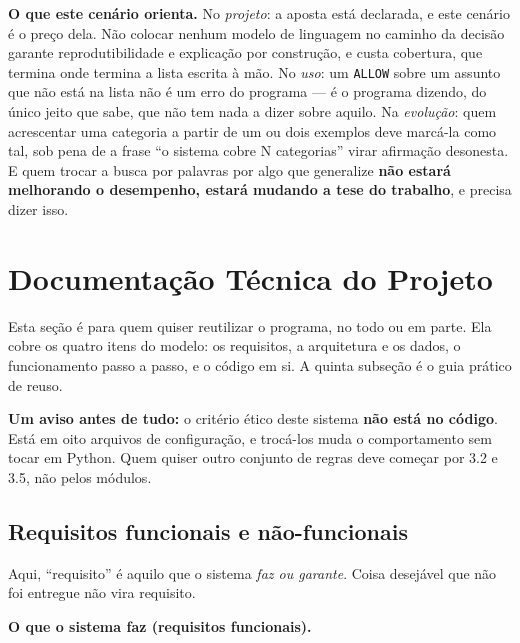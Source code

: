 \documentclass[10pt]{article}
\begin{document}
\textbf{O que este cenário orienta.} No \emph{projeto}: a aposta está declarada, e este cenário é o preço dela. Não colocar nenhum modelo de linguagem no caminho da decisão garante reprodutibilidade e explicação por construção, e custa cobertura, que termina onde termina a lista escrita à mão. No \emph{uso}: um \texttt{ALLOW} sobre um assunto que não está na lista não é um erro do programa --- é o programa dizendo, do único jeito que sabe, que não tem nada a dizer sobre aquilo. Na \emph{evolução}: quem acrescentar uma categoria a partir de um ou dois exemplos deve marcá-la como tal, sob pena de a frase ``o sistema cobre N categorias'' virar afirmação desonesta. E quem trocar a busca por palavras por algo que generalize \textbf{não estará melhorando o desempenho, estará mudando a tese do trabalho}, e precisa dizer isso.

\section{Documentação Técnica do Projeto}

Esta seção é para quem quiser reutilizar o programa, no todo ou em parte. Ela cobre os quatro itens do modelo: os requisitos, a arquitetura e os dados, o funcionamento passo a passo, e o código em si. A quinta subseção é o guia prático de reuso.

\textbf{Um aviso antes de tudo:} o critério ético deste sistema \textbf{não está no código}. Está em oito arquivos de configuração, e trocá-los muda o comportamento sem tocar em Python. Quem quiser outro conjunto de regras deve começar por 3.2 e 3.5, não pelos módulos.

\subsection{Requisitos funcionais e não-funcionais}

Aqui, ``requisito'' é aquilo que o sistema \emph{faz ou garante}. Coisa desejável que não foi entregue não vira requisito.

\textbf{O que o sistema faz (requisitos funcionais).}
\end{document}
